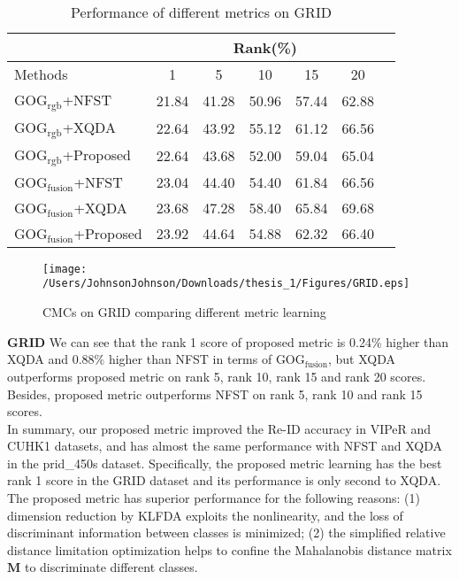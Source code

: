 \begin{table}[H]
\caption{Performance of different metrics on GRID}
\centering
\begin{tabular}{|l|c|c|c|c|c|c|}
\hline
& \multicolumn{5}{|c|}{Rank(\%)} \\
\hline
Methods& 1 & 5 &10& 15&20\\
\hline
GOG$_\text{rgb}$+NFST& 21.84&41.28 &50.96& 57.44&62.88 \\ 
\hline
GOG$_\text{rgb}$+XQDA& 22.64&43.92 &55.12 &61.12&66.56\\ 
\hline
GOG$_\text{rgb}$+Proposed&22.64&43.68&52.00&59.04&65.04\\  %
\hline
GOG$_\text{fusion}$+NFST& 23.04&44.40 &54.40 &61.84&66.56\\ 
\hline
GOG$_\text{fusion}$+XQDA& 23.68&47.28 &58.40 &65.84&69.68 \\ 
\hline
GOG$_\text{fusion}$+Proposed&23.92&44.64&54.88&62.32&66.40\\ %

\hline

\end{tabular}
\end{table}

\begin{figure}[H]
\begin{raggedleft}
\texttt{[image: /Users/JohnsonJohnson/Downloads/thesis\_1/Figures/GRID.eps]}
\vspace{-3em}
\caption{CMCs on GRID comparing different metric learning}
\end{raggedleft}
\end{figure}

\textbf{GRID} We can see that the rank 1 score of proposed metric is 0.24\% higher than XQDA and 0.88\% higher than NFST in terms of GOG$_\text{fusion}$, but XQDA outperforms proposed metric on rank 5, rank 10, rank 15 and rank 20 scores. Besides, proposed metric outperforms NFST on rank 5, rank 10 and rank 15 scores.\\
\indent In summary, our proposed metric improved the Re-ID accuracy in VIPeR and CUHK1 datasets, and has almost the same performance with NFST and XQDA in the prid\_450s dataset. Specifically, the proposed metric learning has the best rank 1 score in the GRID dataset and its performance is only second to XQDA. The proposed metric has superior performance for the following reasons: (1) dimension reduction by KLFDA exploits the nonlinearity, and the loss of discriminant information between classes is minimized; (2) the simplified relative distance limitation optimization helps to confine the Mahalanobis distance matrix $\bm{M}$ to discriminate different classes.  

